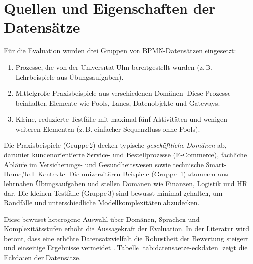 \section{Quellen und Eigenschaften der Datensätze}\label{sec:quellen-und-eigenschaften-der-datensatze}

Für die Evaluation wurden drei Gruppen von \ac{BPMN}-Datensätzen eingesetzt:

\begin{enumerate}
    \item Prozesse, die von der Universität Ulm bereitgestellt wurden (z.\,B. Lehrbeispiele aus Übungsaufgaben).
    \item Mittelgroße Praxisbeispiele aus verschiedenen Domänen. Diese Prozesse beinhalten Elemente wie Pools, Lanes, Datenobjekte und Gateways.
    \item Kleine, reduzierte Testfälle mit maximal fünf Aktivitäten und wenigen weiteren Elementen (z.\,B. einfacher Sequenzfluss ohne Pools).
\end{enumerate}

Die Praxisbeispiele (Gruppe\,2) decken typische \emph{geschäftliche Domänen} ab, darunter kundenorientierte Service- und Bestellprozesse (E-Commerce), fachliche Abläufe im Versicherungs- und Gesundheitswesen sowie technische Smart-Home/IoT-Kontexte. Die universitären Beispiele (Gruppe~1) stammen aus lehrnahen Übungsaufgaben und stellen Domänen wie Finanzen, Logistik und HR dar. Die kleinen Testfälle (Gruppe\,3) sind bewusst minimal gehalten, um Randfälle und unterschiedliche Modellkomplexitäten abzudecken.

Diese bewusst heterogene Auswahl über Domänen, Sprachen und Komplexitätsstufen erhöht die Aussagekraft der Evaluation. In der Literatur wird betont, dass eine erhöhte Datensatzvielfalt die Robustheit der Bewertung steigert und einseitige Ergebnisse vermeidet \cite{blake2025datasetdiversity}. Tabelle \ref{tab:datensaetze-eckdaten} zeigt die Eckdaten der Datensätze.

